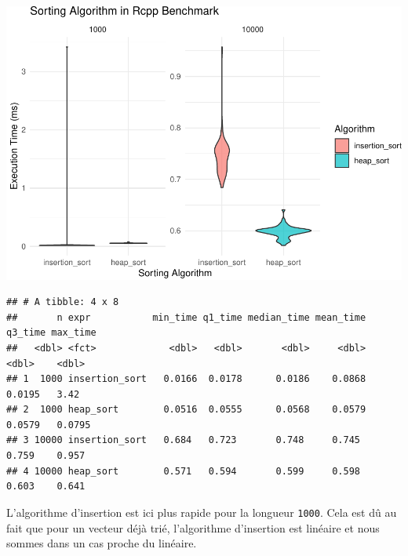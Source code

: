 \documentclass[
]{article}
\begin{document}
\includegraphics{1_Sorting_analyse_files/figure-latex/benchmark2-1.pdf}

\begin{verbatim}
## # A tibble: 4 x 8
##       n expr           min_time q1_time median_time mean_time q3_time max_time
##   <dbl> <fct>             <dbl>   <dbl>       <dbl>     <dbl>   <dbl>    <dbl>
## 1  1000 insertion_sort   0.0166  0.0178      0.0186    0.0868  0.0195   3.42  
## 2  1000 heap_sort        0.0516  0.0555      0.0568    0.0579  0.0579   0.0795
## 3 10000 insertion_sort   0.684   0.723       0.748     0.745   0.759    0.957 
## 4 10000 heap_sort        0.571   0.594       0.599     0.598   0.603    0.641
\end{verbatim}

L'algorithme d'insertion est ici plus rapide pour la longueur
\texttt{1000}. Cela est dû au fait que pour un vecteur déjà trié,
l'algorithme d'insertion est linéaire et nous sommes dans un cas proche
du linéaire.
\end{document}
